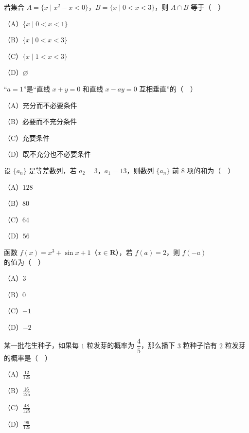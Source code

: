 


\begin{question}
若集合 $A=\{x\mid x^2-x<0\}$，$B=\{x\mid 0<x<3\}$，则 $A\cap B$ 等于（　）

（A）$\{x\mid 0<x<1\}$

（B）$\{x\mid 0<x<3\}$

（C）$\{x\mid 1<x<3\}$

（D）$\varnothing$

\end{question}
\begin{question}
“$a=1$”是“直线 $x+y=0$ 和直线 $x-ay=0$ 互相垂直”的（　）

（A）充分而不必要条件

（B）必要而不充分条件

（C）充要条件

（D）既不充分也不必要条件

\end{question}
\begin{question}
设 $\{a_n\}$ 是等差数列，若 $a_2=3$，$a_1=13$，则数列 $\{a_n\}$ 前 $8$ 项的和为（　）

（A）$128$

（B）$80$

（C）$64$

（D）$56$

\end{question}
\begin{question}
函数 $f(x)=x^3+\sin x+1$（$x\in\mathbf R$），若 $f(a)=2$，则 $f(-a)$ 的值为（　）

（A）$3$

（B）$0$

（C）$-1$

（D）$-2$

\end{question}
\begin{question}
某一批花生种子，如果每 $1$ 粒发芽的概率为 $\dfrac45$，那么播下 $3$ 粒种子恰有 $2$ 粒发芽的概率是（　）

（A）$\frac{12}{125}$

（B）$\frac{16}{125}$

（C）$\frac{48}{125}$

（D）$\frac{96}{125}$

\Needspace{0.4\textheight}
\end{question}
